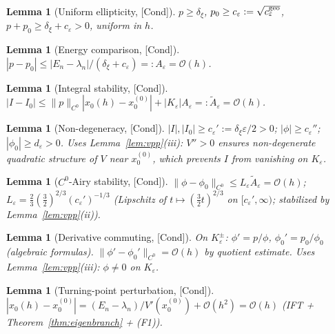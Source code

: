 \documentclass[12pt,a4paper]{amsart}
\newtheorem{lemma}[theorem]{Lemma}
\theoremstyle{definition}
\theoremstyle{remark}
\newcommand{\Cond}{\textup{[Cond]}}
\begin{document}
\begin{lemma}[Uniform ellipticity, \Cond]
\label{lem:uniform-ellipticity}
$p\ge\delta_\xi$, $p_0\ge c_\varepsilon:=\sqrt{c_\varepsilon^{\rm geo}}$,
$p+p_0\ge\delta_\xi+c_\varepsilon>0$, uniform in $h$.
\end{lemma}

\begin{lemma}[Energy comparison, \Cond]
\label{lem:energy-comparison}
$|p-p_0|\le|E_n-\lambda_n|/(\delta_\xi+c_\varepsilon)=:A_\varepsilon=\mathcal{O}(h)$.
\end{lemma}

\begin{lemma}[Integral stability, \Cond]
\label{lem:integral-stability}
$|I-I_0|\le\|p\|_{C^0}|x_0(h)-x_0^{(0)}|+|K_\varepsilon|A_\varepsilon
=:\tilde A_\varepsilon=\mathcal{O}(h)$.
\end{lemma}

\begin{lemma}[Non-degeneracy, \Cond]
\label{lem:nondeg}
$|I|,|I_0|\ge c_\varepsilon':=\delta_\xi\varepsilon/2>0$;
$|\phi|\ge c_\varepsilon''$; $|\phi_0|\ge d_\varepsilon>0$.
\emph{Uses Lemma~\ref{lem:vpp}(iii): $V''>0$ ensures
non-degenerate quadratic structure of $V$ near $x_0^{(0)}$,
which prevents $I$ from vanishing on $K_\varepsilon$.}
\end{lemma}

\begin{lemma}[$C^0$-Airy stability, \Cond]
\label{lem:C0-airy}
$\|\phi-\phi_0\|_{C^0}\le L_\varepsilon\tilde A_\varepsilon=\mathcal{O}(h)$;
$L_\varepsilon=\tfrac23(\tfrac32)^{2/3}(c_\varepsilon')^{-1/3}$
(Lipschitz of $t\mapsto(\tfrac32 t)^{2/3}$ on $[c_\varepsilon',\infty)$;
stabilized by Lemma~\ref{lem:vpp}(ii)).
\end{lemma}

\begin{lemma}[Derivative commuting, \Cond]
\label{lem:deriv-commuting}
On $K_\varepsilon^\pm$:
$\phi'=p/\phi$, $\phi_0'=p_0/\phi_0$ (algebraic formulas).
$\|\phi'-\phi_0'\|_{C^0}=\mathcal{O}(h)$ by quotient estimate.
\emph{Uses Lemma~\ref{lem:vpp}(iii): $\phi\ne 0$ on $K_\varepsilon$.}
\end{lemma}

\begin{lemma}[Turning-point perturbation, \Cond]
\label{lem:tp-perturbation}
$|x_0(h)-x_0^{(0)}|=(E_n-\lambda_n)/V'(x_0^{(0)})+\mathcal{O}(h^2)=\mathcal{O}(h)$
(IFT + Theorem~\ref{thm:eigenbranch} + (F1)).
\end{lemma}
\end{document}
